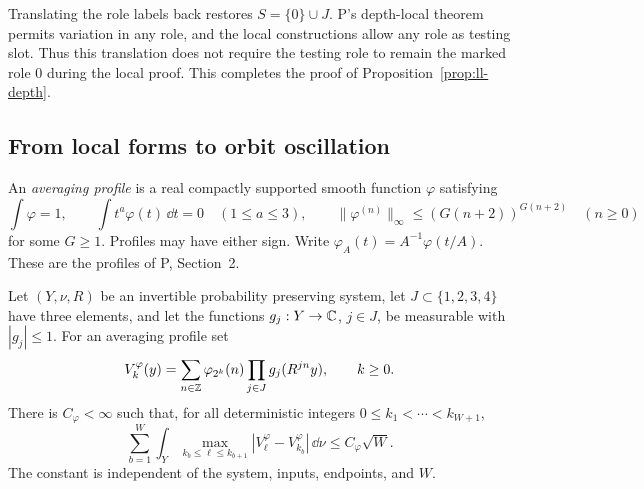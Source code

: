 Translating the role labels back restores $S=\{0\}\cup J$.
P's depth-local theorem permits variation in any role, and the
local constructions allow any role as testing slot.  Thus this
translation does not require the testing role to remain the marked
role $0$ during the local proof.
This completes the proof of Proposition~\ref{prop:ll-depth}.

\subsection{From local forms to orbit oscillation}
\label{subsec:ll-transfer}

An \emph{averaging profile} is a real compactly supported smooth
function $\varphi$ satisfying
\begin{equation}
 \int\varphi=1,\qquad \int t^a\varphi(t)\,\dd t=0\quad(1\le a\le3),
 \qquad
 \|\varphi^{(n)}\|_\infty\le
       (G(n+2))^{G(n+2)}\quad(n\ge0)
 \label{eq:ll-profile}
\end{equation}
for some $G\ge1$.  Profiles may have either sign.  Write
$\varphi_A(t)=A^{-1}\varphi(t/A)$.  These are the profiles of P,
Section~2.

\begin{proposition}
\label{prop:ll-oscillation}
Let $(Y,\nu,R)$ be an invertible probability preserving system,
let $J\subset\{1,2,3,4\}$ have three elements, and let the functions
$g_j:Y\to\mathbb C$, $j\in J$, be measurable with $|g_j|\le1$.
For an averaging profile set
\[
 V_k^\varphi(y)=\sum_{n\in\mathbb Z}\varphi_{2^k}(n)
                   \prod_{j\in J}g_j(R^{jn}y),\qquad k\ge0.
\]
There is $C_\varphi<\infty$ such that, for all deterministic integers
$0\le k_1<\cdots<k_{W+1}$,
\begin{equation}
 \sum_{b=1}^W\int_Y
   \max_{k_b\le\ell\le k_{b+1}}
      |V_\ell^\varphi-V_{k_b}^\varphi|\,\dd\nu
 \le C_\varphi\sqrt W.
 \label{eq:ll-oscillation}
\end{equation}
The constant is independent of the system, inputs, endpoints, and $W$.
\end{proposition}

